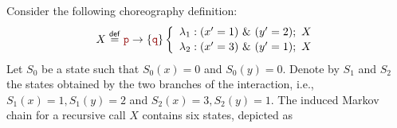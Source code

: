 \begin{exa}\label{example2}
  Consider the following choreography definition:
  \begin{displaymath}
    \begin{array}{lll}
      X \stackrel{\mathsf{def}}{=}
      \interactBase{\nr}{\nrr}
      \left\{
      \begin{array}{l}
        \lambda_1 : (x' = 1)\ \&\ (y' = 2);\ X \\[0.5mm]
        \lambda_2 : (x' = 3)\ \&\ (y' = 1);\ X
      \end{array}
      \right.
    \end{array}
  \end{displaymath}
  Let $S_0$ be a state such that $S_0(x)=0$ and $S_0(y)=0$.  Denote by
  $S_1$ and $S_2$ the states obtained by the two branches of the
  interaction, i.e., $S_1(x)=1,S_1(y)=2$ and $S_2(x)=3,S_2(y)=1$.
  The induced Markov chain for a recursive call $X$ contains six
  states, depicted as
  \begin{center}
\end{center}
\end{exa}
